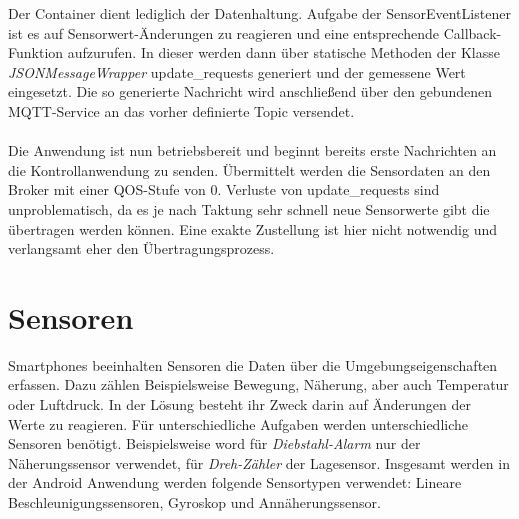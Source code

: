 \documentclass[11pt,a4paper]{report}
\begin{document}
Der Container dient lediglich der Datenhaltung.
Aufgabe der SensorEventListener ist es auf Sensorwert-Änderungen zu reagieren und eine entsprechende Callback-Funktion aufzurufen.
In dieser werden dann über statische Methoden der Klasse \textit{JSONMessageWrapper} update\_requests generiert und der gemessene Wert eingesetzt.
Die so generierte Nachricht wird anschließend über den gebundenen MQTT-Service an das vorher definierte Topic versendet.
\\\\
Die Anwendung ist nun betriebsbereit und beginnt bereits erste Nachrichten an die Kontrollanwendung zu senden.
Übermittelt werden die Sensordaten an den Broker mit einer QOS-Stufe von 0.
Verluste von update\_requests sind unproblematisch, da es je nach Taktung sehr schnell neue Sensorwerte gibt die übertragen werden können.
Eine exakte Zustellung ist hier nicht notwendig und verlangsamt eher den Übertragungsprozess.

\section{Sensoren}
Smartphones beeinhalten Sensoren die Daten über die Umgebungseigenschaften erfassen.
Dazu zählen Beispielsweise Bewegung, Näherung, aber auch Temperatur oder Luftdruck.
In der Lösung besteht ihr Zweck darin auf Änderungen der Werte zu reagieren.
Für unterschiedliche Aufgaben werden unterschiedliche Sensoren benötigt.
Beispielsweise word für \textit{Diebstahl-Alarm} nur der Näherungssensor verwendet, für \textit{Dreh-Zähler} der Lagesensor.
Insgesamt werden in der Android Anwendung werden folgende Sensortypen verwendet: Lineare Beschleunigungssensoren, Gyroskop und Annäherungssensor.
\end{document}
